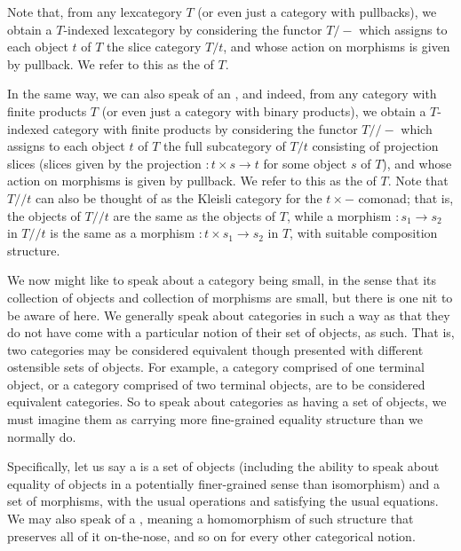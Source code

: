 Note that, from any lexcategory $T$ (or even just a category with pullbacks), we obtain a $T$-indexed lexcategory by considering the functor $T/-$ which assigns to each object $t$ of $T$ the slice category $T/t$, and whose action on morphisms is given by pullback. We refer to this as the  of $T$.

In the same way, we can also speak of an , and indeed, from any category with finite products $T$ (or even just a category with binary products), we obtain a $T$-indexed category with finite products by considering the functor $T//-$ which assigns to each object $t$ of $T$ the full subcategory of $T/t$ consisting of projection slices (slices given by the projection $: t \times s \to t$ for some object $s$ of $T$), and whose action on morphisms is given by pullback. We refer to this as the  of $T$. Note that $T//t$ can also be thought of as the Kleisli category for the $t \times -$ comonad; that is, the objects of $T//t$ are the same as the objects of $T$, while a morphism $: s_1 \to s_2$ in $T//t$ is the same as a morphism $: t \times s_1 \to s_2$ in $T$, with suitable composition structure.

We now might like to speak about a category being small, in the sense that its collection of objects and collection of morphisms are small, but there is one nit to be aware of here. We generally speak about categories in such a way as that they do not have come with a particular notion of their set of objects, as such. That is, two categories may be considered equivalent though presented with different ostensible sets of objects. For example, a category comprised of one terminal object, or a category comprised of two terminal objects, are to be considered equivalent categories. So to speak about categories as having a set of objects, we must imagine them as carrying more fine-grained equality structure than we normally do.

Specifically, let us say a  is a set of objects (including the ability to speak about equality of objects in a potentially finer-grained sense than isomorphism) and a set of morphisms, with the usual operations and satisfying the usual equations.  We may also speak of a , meaning a homomorphism of such structure that preserves all of it on-the-nose, and so on for every other categorical notion.

